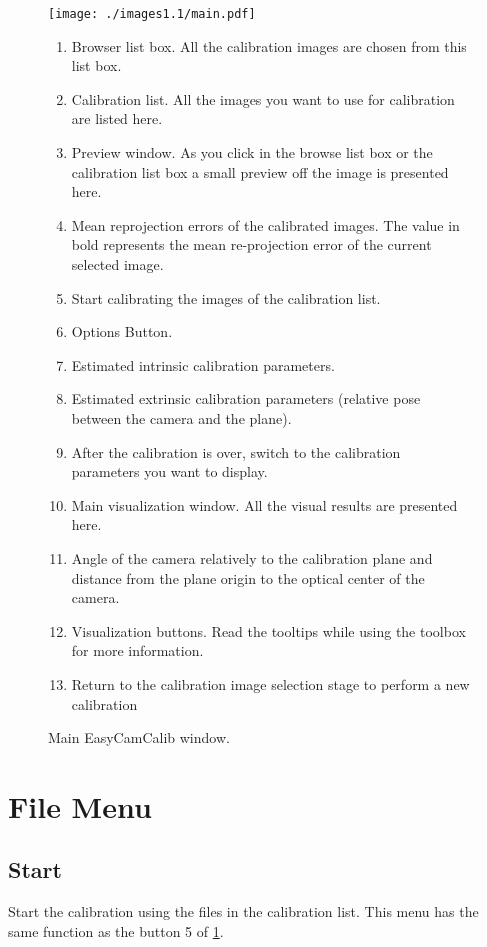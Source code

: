 \documentclass[article,11pt]{memoir}
\begin{document}
\begin{figure}
 \texttt{[image: ./images1.1/main.pdf]}
 \caption{Main EasyCamCalib window.}
\begin{multicols}{2}
\begin{scriptsize}
\begin{enumerate}
 \item Browser list box. All the calibration images are chosen from this list box.
 \item Calibration list. All the images you want to use for calibration are listed here.
 \item Preview window. As you click in the browse list box or the calibration list box a small preview off the image is presented here.
 \item Mean reprojection errors of the calibrated images. The value in bold represents the mean re-projection error of the current selected image.
 \item Start calibrating the images of the calibration list.
 \item Options Button.	
 \item Estimated intrinsic calibration parameters.	 
 \item Estimated extrinsic calibration parameters (relative pose between the camera and the plane). 
 \item After the calibration is over, switch to the calibration parameters you want to display. 
 \item Main visualization window. All the visual results are presented here.
 \item Angle of the camera relatively to the calibration plane and distance from the plane origin to the optical center of the camera.
 \item Visualization buttons. Read the tooltips while using the toolbox for more information.
 \item Return to the calibration image selection stage to perform a new calibration 
\end{enumerate}
\end{scriptsize}
\end{multicols}  
\label{fig:mainwin}
\end{figure}


\section{File Menu}

\subsection{Start}
Start the calibration using the files in the calibration list. This menu has the same function as the button 5 of \figurename \ref{fig:mainwin}.
\end{document}
